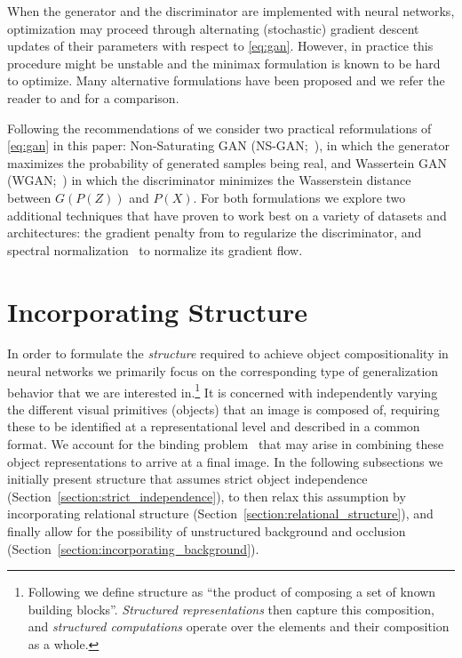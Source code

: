 \documentclass{article}
\begin{document}
When the generator and the discriminator are implemented with neural networks, optimization may proceed through alternating (stochastic) gradient descent updates of their parameters with respect to \eqref{eq:gan}. However, in practice this procedure might be unstable and the minimax formulation is known to be hard to optimize.
Many alternative formulations have been proposed and we refer the reader to \cite{lucic2017gans} and \cite{kurach2018gan} for a comparison.

Following the recommendations of \cite{kurach2018gan} we consider two practical reformulations of \eqref{eq:gan} in this paper: Non-Saturating GAN (NS-GAN;~\cite{goodfellow2014generative}), in which the generator maximizes the probability of generated samples being real, and Wassertein GAN (WGAN;~\cite{arjovsky2017wasserstein}) in which the discriminator minimizes the Wasserstein distance between $G(P(Z))$ and $P(X)$. For both formulations we explore two additional techniques that have proven to work best on a variety of datasets and architectures: the gradient penalty from \cite{gulrajani2017improved} to regularize the discriminator, and spectral normalization~\citep{miyato2018spectral} to normalize its gradient flow.

\section{Incorporating Structure}
In order to formulate the \emph{structure} required to achieve object compositionality in neural networks we primarily focus on the corresponding type of generalization behavior that we are interested in.\footnote{Following \cite{battaglia2018relational} we define structure as ``the product of composing a set of known building blocks''. \emph{Structured representations} then capture this composition, and \emph{structured computations} operate over the elements and their composition as a whole.}
It is concerned with independently varying the different visual primitives (objects) that an image is composed of, requiring these to be identified at a representational level and described in a common format. %
We account for the binding problem~\citep{hinton1984distributed, milner1974model, von1994correlation} that may arise in combining these object representations to arrive at a final image.
In the following subsections we initially present structure that assumes strict object independence (Section~\ref{section:strict_independence}), to then relax this assumption by incorporating relational structure (Section~\ref{section:relational_structure}), and finally allow for the possibility of unstructured background and occlusion (Section~\ref{section:incorporating_background}).
\end{document}
